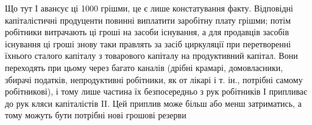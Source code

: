 Що тут І авансує ці 1000 грішми, це є лише констатування
факту. Відповідні капіталістичні продуценти повинні виплатити заробітну
плату грішми; потім робітники витрачають ці гроші на засоби
існування, а для продавців засобів існування ці гроші знову таки правлять
за засіб циркуляції при перетворенні їхнього сталого капіталу
з товарового капіталу на продуктивний капітал. Вони переходять при
цьому через багато каналів (дрібні крамарі, домовласники, збирачі
податків, непродуктивні робітники, як от лікарі і т. ін., потрібні самому
робітникові), і тому лише частина їх безпосередньо з рук робітників І
припливає до рук кляси капіталістів II. Цей приплив може більш або
менш затриматись, а тому можуть бути потрібні нові грошові резерви
\parbreak{}  %
